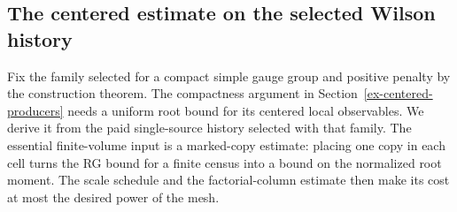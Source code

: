 \subsection{The centered estimate on the selected Wilson history}\label{ex-centered-construction}

Fix the family selected for a compact simple gauge group and positive penalty by the construction theorem. The compactness argument in Section~\ref{ex-centered-producers} needs a uniform root bound for its centered local observables. We derive it from the paid single-source history selected with that family. The essential finite-volume input is a marked-copy estimate: placing one copy in each cell turns the RG bound for a finite census into a bound on the normalized root moment. The scale schedule and the factorial-column estimate then make its cost at most the desired power of the mesh.

